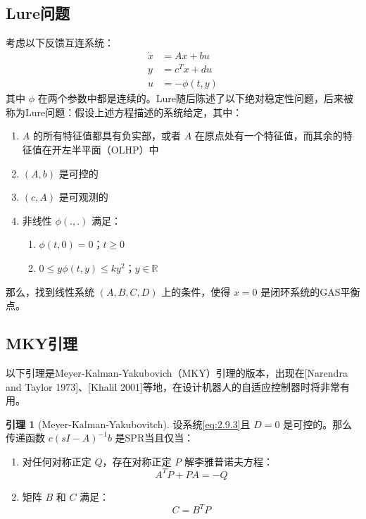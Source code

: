 \documentclass[UTF8,12pt,a4paper]{ctexart}
\theoremstyle{definition}
\newtheorem{lemma}{引理}[section]
\begin{document}
\subsection{Lure问题}

考虑以下反馈互连系统：
\begin{equation}\label{eq:2.9.3}
\begin{aligned}
\dot{x} &= Ax + b u \\
y &= c^T x + d u \\
u &= -\phi(t, y)
\end{aligned}
\end{equation}
其中 $\phi$ 在两个参数中都是连续的。Lure随后陈述了以下绝对稳定性问题，后来被称为Lure问题：假设上述方程描述的系统给定，其中：
\begin{enumerate}
\item $A$ 的所有特征值都具有负实部，或者 $A$ 在原点处有一个特征值，而其余的特征值在开左半平面（OLHP）中
\item $(A, b)$ 是可控的
\item $(c, A)$ 是可观测的
\item 非线性 $\phi(.,.)$ 满足：
\begin{enumerate}
\item $\phi(t, 0) = 0$；$t \geq 0$
\item $0 \leq y\phi(t, y) \leq k y^2$；$y \in \mathbb{R}$
\end{enumerate}
\end{enumerate}
那么，找到线性系统 $(A, B, C, D)$ 上的条件，使得 $x=0$ 是闭环系统的GAS平衡点。

\subsection{MKY引理}

以下引理是Meyer-Kalman-Yakubovich（MKY）引理的版本，出现在[Narendra and Taylor 1973]、[Khalil 2001]等地，在设计机器人的自适应控制器时将非常有用。

\begin{lemma}[Meyer-Kalman-Yakubovitch]
设系统\eqref{eq:2.9.3}且 $D=0$ 是可控的。那么传递函数 $c(sI-A)^{-1}b$ 是SPR当且仅当：
\begin{enumerate}
\item 对任何对称正定 $Q$，存在对称正定 $P$ 解李雅普诺夫方程：
\[
A^T P + PA = -Q
\]
\item 矩阵 $B$ 和 $C$ 满足：
\[
C = B^T P
\]
\end{enumerate}
\end{lemma}
\end{document}
